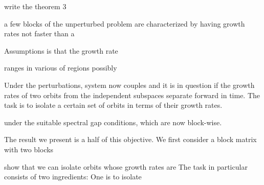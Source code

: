 \documentclass[a4paper,11pt]{article}
\newcommand{\tl}{{\underline{\theta}}}
\newcommand{\bt}{{\bar{t}}}
\theoremstyle{remark}
\begin{document}
% 


write the theorem 3


a few blocks of the unperturbed problem are characterized by having growth rates not faster than a 




Assumptions is that the growth rate 



ranges in various of regions possibly 


Under the perturbations, system now couples and it is in question if the growth rates of two orbits from the independent subspaces separate forward in time. The task is to isolate a certain set of orbits in terms of their growth rates.



under the suitable spectral gap conditions, which are now block-wise. 

The result we present is a half of this objective. We first consider a block matrix with two blocks 


show that we can isolate orbits whose growth rates are The task in particular consists of two ingredients: One is to isolate 
\end{document}
